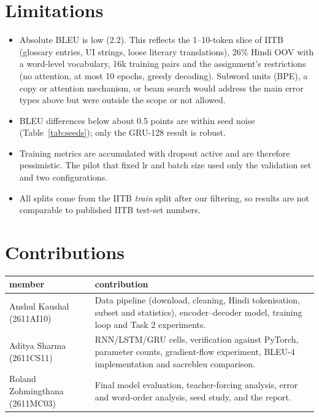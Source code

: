 \documentclass[10pt,a4paper]{article}
\begin{document}
\section{Limitations}
\begin{itemize}
\item Absolute BLEU is low (2.2). This reflects the 1--10-token slice of IITB (glossary entries, UI strings,
loose literary translations), 26\% Hindi OOV with a word-level vocabulary, 16k training pairs and the
assignment's restrictions (no attention, at most 10 epochs, greedy decoding). Subword units (BPE), a copy or
attention mechanism, or beam search would address the main error types above but were outside the scope or
not allowed.
\item BLEU differences below about 0.5 points are within seed noise (Table~\ref{tab:seeds}); only the
GRU-128 result is robust.
\item Training metrics are accumulated with dropout active and are therefore pessimistic. The pilot that fixed
lr and batch size used only the validation set and two configurations.
\item All splits come from the IITB \emph{train} split after our filtering, so results are not comparable
to published IITB test-set numbers.
\end{itemize}

\section{Contributions}
\begin{table}[H]
\centering\small
\begin{tabularx}{\textwidth}{lY}
\toprule
member & contribution \\
\midrule
Anshul Kaushal (2611AI10) & Data pipeline (download, cleaning, Hindi tokenisation, subset and statistics),
encoder--decoder model, training loop and Task 2 experiments. \\
Aditya Sharma (2611CS11) & RNN/LSTM/GRU cells, verification against PyTorch, parameter counts, gradient-flow
experiment, BLEU-4 implementation and sacrebleu comparison. \\
Roland Zohmingthana (2611MC03) & Final model evaluation, teacher-forcing analysis, error and word-order analysis,
seed study, and the report. \\
\bottomrule
\end{tabularx}
\end{table}
\end{document}
